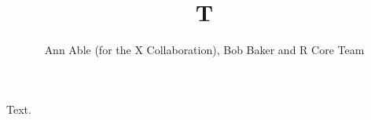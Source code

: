 \documentclass{article}
\begin{document}
\title{T}
\author{Ann Able (for the X Collaboration), Bob Baker and R Core Team}
\maketitle
Text.
\end{document}
